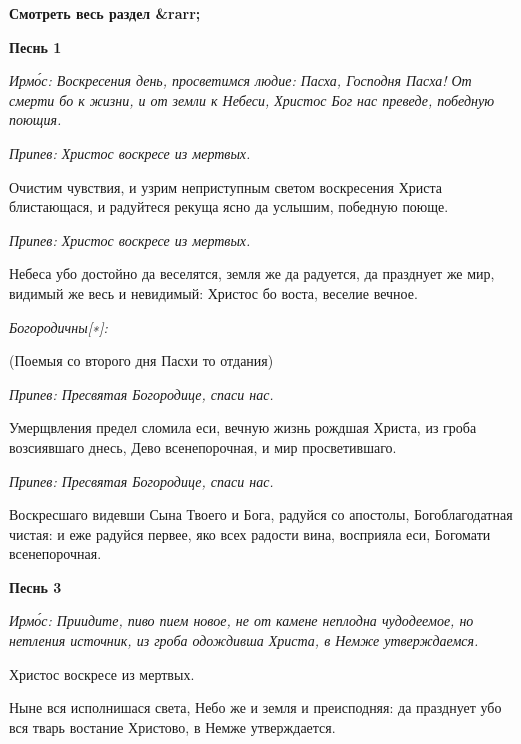 


\bfseries Смотреть весь раздел &rarr;\normalfont{} 

 





\bfseries Песнь 1\normalfont{}


\itshape Ирмо́с:\normalfont{} Воскресения день, просветимся людие: Пасха, Господня Пасха! От смерти бо к жизни, и от земли к Небеси, Христос Бог нас преведе, победную поющия.


\itshape Припев:\normalfont{} Христос воскресе из мертвых.


Очистим чувствия, и узрим неприступным светом воскресения Христа блистающася, и радуйтеся рекуща ясно да услышим, победную поюще.


\itshape Припев:\normalfont{} Христос воскресе из мертвых.


Небеса убо достойно да веселятся, земля же да радуется, да празднует же мир, видимый же весь и невидимый: Христос бо воста, веселие вечное.


\itshape Богородичны[∗]:


(Поемыя со второго дня Пасхи то отдания)\normalfont{}


\itshape Припев:\normalfont{} Пресвятая Богородице, спаси нас.


Умерщвления предел сломила еси, вечную жизнь рождшая Христа, из гроба возсиявшаго днесь, Дево всенепорочная, и мир просветившаго.


\itshape Припев:\normalfont{} Пресвятая Богородице, спаси нас.


Воскресшаго видевши Сына Твоего и Бога, радуйся со апостолы, Богоблагодатная чистая: и еже радуйся первее, яко всех радости вина, восприяла еси, Богомати всенепорочная.





\bfseries Песнь 3\normalfont{}


\itshape Ирмо́с:\normalfont{} Приидите, пиво пием новое, не от камене неплодна чудодеемое, но нетления источник, из гроба одождивша Христа, в Немже утверждаемся.


Христос воскресе из мертвых.


Ныне вся исполнишася света, Небо же и земля и преисподняя: да празднует убо вся тварь востание Христово, в Немже утверждается.


